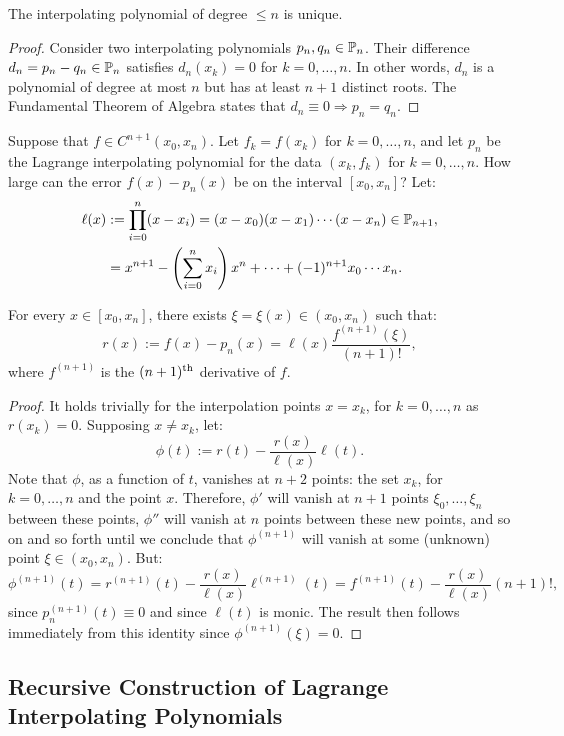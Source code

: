 \begin{theorem}
The interpolating polynomial of degree $\le n$ is unique.
\end{theorem}
\begin{proof}
Consider two interpolating polynomials $p_n,q_n\in\P_n$. Their difference $d_n=p_n-q_n\in\P_n$ satisfies $d_n(x_k) = 0$ for $k=0,\ldots,n$. In other words, $d_n$ is a polynomial of degree at most $n$ but has at least $n+1$ distinct roots. The Fundamental Theorem of Algebra states that $d_n\equiv 0\Rightarrow p_n=q_n$.
\end{proof}

Suppose that $f\in C^{n+1}(x_0,x_n)$. Let $f_k = f(x_k)$ for $k=0,\ldots,n$, and let $p_n$ be the Lagrange interpolating polynomial for the data $(x_k,f_k)$ for $k=0,\ldots,n$. How large can the error $f(x)-p_n(x)$ be on the interval $[x_0,x_n]$? Let:
\begin{align}
\ell(x) & := \prod_{i=0}^n(x-x_i) = (x-x_0)(x-x_1)\cdots(x-x_n)\in\P_{n+1},\label{eq:Omega}\\
& = x^{n+1} - \pr(\sum_{i=0}^nx_i)x^n +\cdots+(-1)^{n+1}x_0\cdots x_n.\nonumber
\end{align}

\begin{theorem}\label{theorem:LagrangeInterpolatingRemainder}
For every $x\in[x_0,x_n]$, there exists $\xi = \xi(x) \in (x_0,x_n)$ such that:
\[
r(x) := f(x)-p_n(x) = \ell(x)\dfrac{f^{(n+1)}(\xi)}{(n+1)!},
\]
where $f^{(n+1)}$ is the $(n+1)^{\rm th}$ derivative of $f$.
\end{theorem}
\begin{proof}
It holds trivially for the interpolation points $x=x_k$, for $k=0,\ldots,n$ as $r(x_k) = 0$. Supposing $x\ne x_k$, let:
\[
\phi(t) := r(t) - \dfrac{r(x)}{\ell(x)}\ell(t).
\]
Note that $\phi$, as a function of $t$, vanishes at $n+2$ points: the set $x_k$, for $k=0,\ldots,n$ and the point $x$. Therefore, $\phi'$ will vanish at $n+1$ points $\xi_0,\ldots,\xi_n$ between these points, $\phi''$ will vanish at $n$ points between these new points, and so on and so forth until we conclude that $\phi^{(n+1)}$ will vanish at some (unknown) point $\xi\in(x_0,x_n)$. But:
\[
\phi^{(n+1)}(t) = r^{(n+1)}(t) - \dfrac{r(x)}{\ell(x)}\ell^{(n+1)}(t) = f^{(n+1)}(t) - \dfrac{r(x)}{\ell(x)}(n+1)!,
\]
since $p_n^{(n+1)}(t) \equiv 0$ and since $\ell(t)$ is monic. The result then follows immediately from this identity since $\phi^{(n+1)}(\xi) = 0$.
\end{proof}

\subsection{Recursive Construction of Lagrange Interpolating Polynomials}

